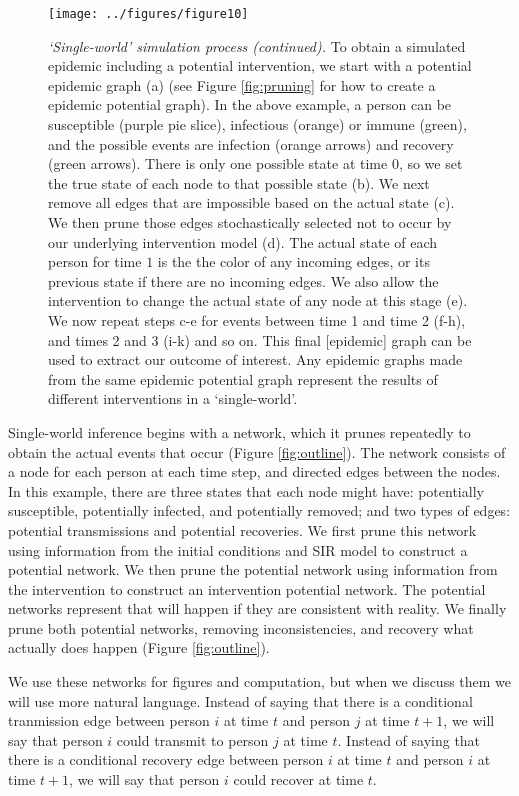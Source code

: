 \documentclass[PTRSB]{rsos}
\makeatletter
\def\checkGraphicsWidth{\ifdim\Gin@nat@width>\linewidth
	\tsGraphicsScaleX\linewidth\else\Gin@nat@width\fi}
\let\ts@includegraphics\includegraphics
\renewcommand{\includegraphics}[1]{\ts@includegraphics[width=\checkGraphicsWidth]{#1}}
\makeatother
\begin{document}
\begin{multicols}{2}
\begin{figure}[hp]
\texttt{[image: ../figures/figure10]}
\caption{\textit{‘Single-world’ simulation process (continued).}
  To obtain a simulated epidemic including a potential intervention, we start with a potential epidemic graph (a) (see Figure \ref{fig:pruning} for how to create a epidemic potential graph).
  In the above example, a person can be susceptible (purple pie slice), infectious (orange) or immune (green), and the possible events are infection (orange arrows) and recovery (green arrows). %
  There is only one possible state at time $0$, so we set the true state of each node to that possible state (b).
  We next remove all edges that are impossible based on the actual state (c). %
  We then prune those edges stochastically selected not to occur by our underlying intervention model (d).
  The actual state of each person for time $1$ is the the color of any incoming edges, or its previous state if there are no incoming edges.
  We also allow the intervention to change the actual state of any node at this stage (e).
  We now repeat steps c-e for events between time 1 and time 2 (f-h), and times 2 and 3 (i-k) and so on.
  This final [epidemic] graph can be used to extract our outcome of interest.
  Any epidemic graphs made from the same epidemic potential graph represent the results of different interventions in a `single-world'.
}
\label{fig:actualizing}
\end{figure}

Single-world inference begins with a network, which it prunes repeatedly to obtain the actual events that occur (Figure \ref{fig:outline}).
The network consists of a node for each person at each time step, and directed edges between the nodes.
In this example, there are three states that each node might have: potentially susceptible, potentially infected, and potentially removed; and two types of edges: potential transmissions and potential recoveries.
We first prune this network using information from the initial conditions and SIR model to construct a potential network.
We then prune the potential network using information from the intervention to construct an intervention potential network.
The potential networks represent that will happen if they are consistent with reality.
We finally prune both potential networks, removing inconsistencies, and recovery what actually does happen (Figure \ref{fig:outline}).

We use these networks for figures and computation, but when we discuss them we will use more natural language.
Instead of saying that there is a conditional tranmission edge between person $i$ at time $t$ and person $j$ at time $t+1$, we will say that person $i$ could transmit to person $j$ at time $t$.
Instead of saying that there is a conditional recovery edge between person $i$ at time $t$ and person $i$ at time $t+1$, we will say that person $i$ could recover at time $t$.


\end{multicols}
\end{document}

